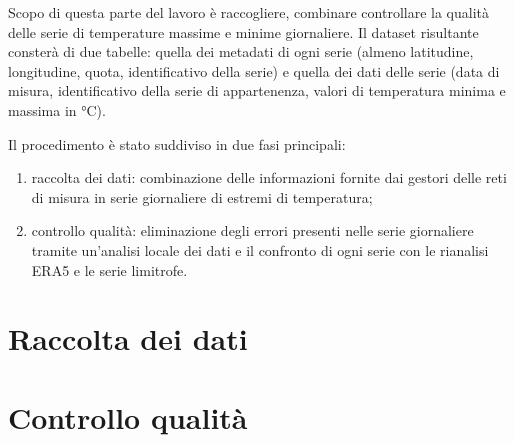 
Scopo di questa parte del lavoro è raccogliere, combinare controllare la qualità delle serie di temperature massime e minime giornaliere. Il dataset risultante consterà di due tabelle: quella dei metadati di ogni serie (almeno latitudine, longitudine, quota, identificativo della serie) e quella dei dati delle serie (data di misura, identificativo della serie di appartenenza, valori di temperatura minima e massima in \(\unit{\degreeCelsius}\)).

Il procedimento è stato suddiviso in due fasi principali:

\begin{enumerate}
  \item raccolta dei dati: combinazione delle informazioni fornite dai gestori delle reti di misura in serie giornaliere di estremi di temperatura;
  \item controllo qualità: eliminazione degli errori presenti nelle serie giornaliere tramite un'analisi locale dei dati e il confronto di ogni serie con le rianalisi ERA5 e le serie limitrofe.
\end{enumerate}

\section{Raccolta dei dati}\label{ch:raccolta-dati}


\section{Controllo qualità}\label{ch:qc}

